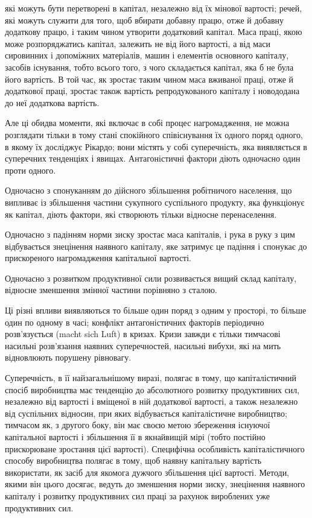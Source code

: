 \parcont{}  %
які можуть бути перетворені в капітал, незалежно від їх мінової
вартості; речей, які можуть служити для того, щоб вбирати добавну
працю, отже й добавну додаткову працю, і таким чином
утворити додатковий капітал. Маса праці, якою може розпоряджатись
капітал, залежить не від його вартості, а від маси
сировинних і допоміжних матеріалів, машин і елементів основного
капіталу, засобів існування, тобто всього того, з чого складається
капітал, яка б не була його вартість. В той час, як зростає
таким чином маса вживаної праці, отже й додаткової праці, зростає
також вартість репродукованого капіталу і новододана до
неї додаткова вартість.

Але ці обидва моменти, які включає в собі процес нагромадження,
не можна розглядати тільки в тому стані спокійного співіснування
їх одного поряд одного, в якому їх досліджує Рікардо;
вони містять у собі суперечність, яка виявляється в суперечних
тенденціях і явищах. Антагоністичні фактори діють одночасно
один проти одного.

Одночасно з спонуканням до дійсного збільшення робітничого
населення, що випливає із збільшення частини сукупного
суспільного продукту, яка функціонує як капітал, діють фактори,
які створюють тільки відносне перенаселення.

Одночасно з падінням норми зиску зростає маса капіталів,
і рука в руку з цим відбувається знецінення наявного капіталу,
яке затримує це падіння і спонукає до прискореного нагромадження
капітальної вартості.

Одночасно з розвитком продуктивної сили розвивається
вищий склад капіталу, відносне зменшення змінної частини порівняно
з сталою.

Ці різні впливи виявляються то більше один поряд з одним
у просторі, то більше один по одному в часі; конфлікт антагоністичних
факторів періодично розв’язується (macht sich Luft)
в кризах. Кризи завжди є тільки тимчасові насильні розв’язання
наявних суперечностей, насильні вибухи, які на мить відновлюють
порушену рівновагу.

Суперечність, в її найзагальнішому виразі, полягає в тому,
що капіталістичний спосіб виробництва має тенденцію до абсолютного
розвитку продуктивних сил, незалежно від вартості і
вміщеної в ній додаткової вартості, а також незалежно від
суспільних відносин, при яких відбувається капіталістичне виробництво;
тимчасом як, з другого боку, він має своєю метою
збереження існуючої капітальної вартості і збільшення її в якнайвищій
мірі (тобто постійно прискорюване зростання цієї вартості).
Специфічна особливість капіталістичного способу виробництва
полягає в тому, щоб наявну капітальну вартість використати,
як засіб для якомога дужчого збільшення цієї вартості. Методи,
якими він цього досягає, ведуть до зменшення норми зиску,
знецінення наявного капіталу і розвитку продуктивних сил праці
за рахунок вироблених уже продуктивних сил.
